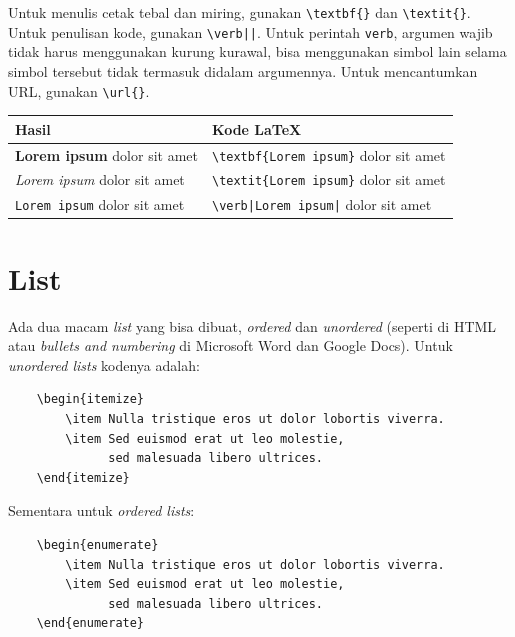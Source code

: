 Untuk menulis cetak tebal dan miring, gunakan \verb|\textbf{}| dan \verb|\textit{}|. Untuk penulisan kode, gunakan \verb/\verb||/. Untuk perintah \texttt{verb}, argumen wajib tidak harus menggunakan kurung kurawal, bisa menggunakan simbol lain selama simbol tersebut tidak termasuk didalam argumennya. Untuk mencantumkan URL, gunakan \verb|\url{}|.

\begin{table}[H]
    \centering
    \begin{tabular}{l  l}
        Hasil & Kode LaTeX \\
        \midrule
        \textbf{Lorem ipsum} dolor sit amet & \verb|\textbf{Lorem ipsum}| dolor sit amet \\
        \textit{Lorem ipsum} dolor sit amet & \verb|\textit{Lorem ipsum}| dolor sit amet \\
        \verb|Lorem ipsum| dolor sit amet & \verb[\verb|Lorem ipsum|[ dolor sit amet \\
    \end{tabular}
\end{table}

\section{List}

Ada dua macam \textit{list} yang bisa dibuat, \textit{ordered} dan \textit{unordered} (seperti di HTML atau \textit{bullets and numbering} di Microsoft Word dan Google Docs). Untuk \textit{unordered lists} kodenya adalah: 

\begin{verbatim}
    \begin{itemize}
        \item Nulla tristique eros ut dolor lobortis viverra.
        \item Sed euismod erat ut leo molestie, 
              sed malesuada libero ultrices.
    \end{itemize}
\end{verbatim}

Sementara untuk \textit{ordered lists}: 

\begin{verbatim}
    \begin{enumerate}
        \item Nulla tristique eros ut dolor lobortis viverra.
        \item Sed euismod erat ut leo molestie, 
              sed malesuada libero ultrices.
    \end{enumerate}
\end{verbatim}


